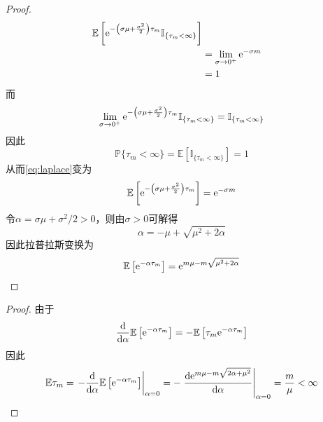 \documentclass[cn]{homework}
\newcommand{\E}{\mathbb E}
\begin{document}
\begin{subproblem}
\begin{proof}
\[\begin{aligned}
            \E\left[\e^{-\left(\sigma\mu+\frac{\sigma^2}{2}\right)\tau_m}
            \mathbb I_{\{\tau_m<\infty\}}\right]\\
            &=\lim_{\sigma\to0^+}\e^{-\sigma m}\\
            &=1\\
            \end{aligned}\]
            而
            \[\lim_{\sigma\to0^+}
            \mathrm e^{-\left(\sigma\mu+\frac{\sigma^2}{2}\right)\tau_m}
            \mathbb I_{\{\tau_m<\infty\}}
            =\mathbb I_{\{\tau_m<\infty\}}\]
            因此
            \[\mathbb P\{\tau_m<\infty\}
            =\E\left[\mathbb I_{\{\tau_m<\infty\}}\right]=1\]
            从而\cref{eq:laplace}变为
            \[\E\left[\e^{-\left(\sigma\mu+\frac{\sigma^2}{2}\right)\tau_m}\right]
            =\e^{-\sigma m}\]
            令$\alpha=\sigma\mu+\sigma^2/2>0$，则由$\sigma>0$可解得
            \[\alpha=-\mu+\sqrt{\mu^2+2\alpha}\]
            因此拉普拉斯变换为
            \[\E\left[\e^{-\alpha\tau_m}\right]
            =\e^{m\mu-m\sqrt{\mu^2+2\alpha}}\]
            
        \end{proof}

        \item
        \begin{proof}
        由于
        \[\frac{\diff}{\diff \alpha}
        \E\left[\e^{-\alpha\tau_m}\right]
        =-\E\left[\tau_m\e^{-\alpha\tau_m}\right]\]
        因此
        \[\E\tau_m=\left.-\frac{\diff}{\diff\alpha}
        \E\left[\e^{-\alpha\tau_m}\right]\right|_{\alpha=0}
        =-\left.\frac{\diff\e^{m\mu-m\sqrt{2\alpha+\mu^2}}}{\diff\alpha}\right|_{\alpha=0}
        =\frac{m}{\mu}<\infty\]
        \end{proof}


\end{subproblem}
\end{document}
